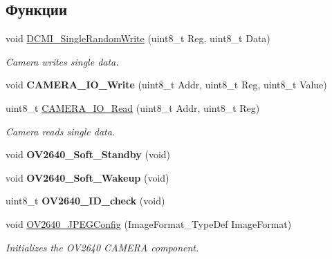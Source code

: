 \subsection*{Функции}
\begin{DoxyCompactItemize}
\item 
void \hyperlink{group___o_v2640___private___functions_gabb581a828532aa534596ea82b558b239}{D\+C\+M\+I\+\_\+\+Single\+Random\+Write} (uint8\+\_\+t Reg, uint8\+\_\+t Data)
\begin{DoxyCompactList}\small\item\em Camera writes single data. \end{DoxyCompactList}\item 
\mbox{\label{group___o_v2640___private___functions_ga13f5c102ea099728a3ca5f0686876a60}} 
void {\bfseries C\+A\+M\+E\+R\+A\+\_\+\+I\+O\+\_\+\+Write} (uint8\+\_\+t Addr, uint8\+\_\+t Reg, uint8\+\_\+t Value)
\item 
uint8\+\_\+t \hyperlink{group___o_v2640___private___functions_gaf0a9c7f2380cdcd4bcd801a5681d3b4b}{C\+A\+M\+E\+R\+A\+\_\+\+I\+O\+\_\+\+Read} (uint8\+\_\+t Addr, uint8\+\_\+t Reg)
\begin{DoxyCompactList}\small\item\em Camera reads single data. \end{DoxyCompactList}\item 
\mbox{\label{group___o_v2640___private___functions_ga2a1ea5c5164eaaee2367100fc31fd4ad}} 
void {\bfseries O\+V2640\+\_\+\+Soft\+\_\+\+Standby} (void)
\item 
\mbox{\label{group___o_v2640___private___functions_gaa5edc1649dc35f3a8cb975921b9e59c8}} 
void {\bfseries O\+V2640\+\_\+\+Soft\+\_\+\+Wakeup} (void)
\item 
\mbox{\label{group___o_v2640___private___functions_gaba6fd377ed3b31798b6dbf0315957bb1}} 
uint8\+\_\+t {\bfseries O\+V2640\+\_\+\+I\+D\+\_\+check} (void)
\item 
void \hyperlink{group___o_v2640___private___functions_gab8212120406cb75db2b159188d708160}{O\+V2640\+\_\+\+J\+P\+E\+G\+Config} (Image\+Format\+\_\+\+Type\+Def Image\+Format)
\begin{DoxyCompactList}\small\item\em Initializes the O\+V2640 C\+A\+M\+E\+RA component. \end{DoxyCompactList}\item 

\end{DoxyCompactItemize}

